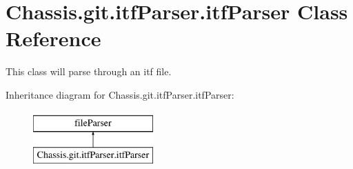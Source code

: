 \hypertarget{class_chassis_8git_1_1itf_parser_1_1itf_parser}{\section{Chassis.\-git.\-itf\-Parser.\-itf\-Parser Class Reference}
\label{class_chassis_8git_1_1itf_parser_1_1itf_parser}
}


This class will parse through an itf file.  


Inheritance diagram for Chassis.\-git.\-itf\-Parser.\-itf\-Parser\-:\begin{figure}[H]
\begin{center}
\leavevmode
\includegraphics[height=2.000000cm]{class_chassis_8git_1_1itf_parser_1_1itf_parser}
\end{center}
\end{figure}
